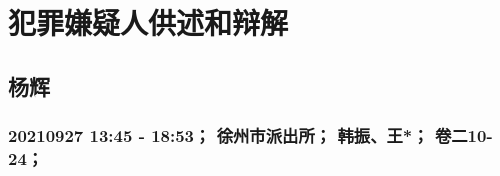 \section{
    犯罪嫌疑人供述和辩解
}
\subsection{
    杨辉
}
\subsubsection{
    20210927 13:45 - 18:53；
    徐州市派出所；
    韩振、王*；
    卷二10-24；
}
